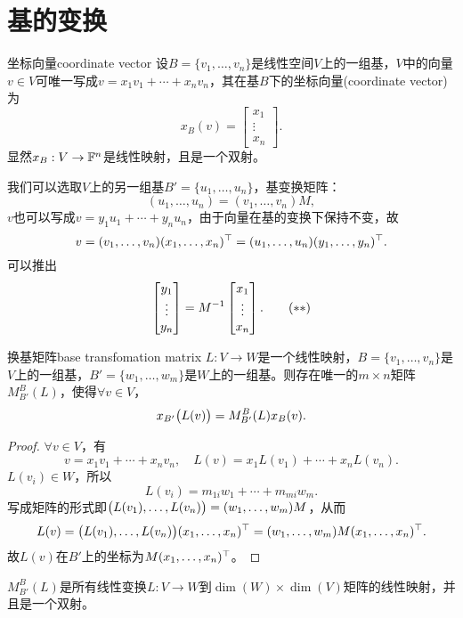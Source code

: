 \section{基的变换}
\begin{definition}{坐标向量}{coordinate vector}
	设$B=\{v_1,\ldots,v_n\}$是线性空间$V$上的一组基，$V$中的向量$v\in V$可唯一写成$v=x_1v_1+\cdots+x_nv_n$，其在基$B$下的坐标向量(coordinate vector)为
	\[
		x_B(v)=\begin{bmatrix}
			x_1\\\vdots\\x_n
		\end{bmatrix}.
	\]
	显然$x_B:V\to\mathbb F^n$是线性映射，且是一个双射。
\end{definition}
我们可以选取$V$上的另一组基$B'=\{u_1,\ldots,u_n\}$，基变换矩阵：
\[
	(u_1,\ldots,u_n)=(v_1,\ldots,v_n)M,\tag{$\ast$}
\]
$v$也可以写成$v=y_1u_1+\cdots+y_nu_n$，由于向量在基的变换下保持不变，故
\[
	v=(v_1,\ldots,v_n)(x_1,\ldots,x_n)^\top=(u_1,\ldots,u_n)(y_1,\ldots,y_n)^\top.
\]
可以推出
\[
	\begin{bmatrix}
		y_1\\\vdots\\y_n
	\end{bmatrix}=M^{-1}\begin{bmatrix}
		x_1\\\vdots\\x_n
	\end{bmatrix}.\tag{$\ast\ast$}
\]
\begin{theorem}{换基矩阵}{base transfomation matrix}
	$L:V\to W$是一个线性映射，$B=\{v_1,\ldots,v_n\}$是$V$上的一组基，$B'=\{w_1,\ldots,w_m\}$是$W$上的一组基。则存在唯一的$m\times n$矩阵$M_{B'}^B(L)$，使得$\forall v\in V$，
	\[
		x_{B'}\bigl(L(v)\bigr)=M_{B'}^B(L)x_B(v).
	\]
\end{theorem}
\begin{proof}
	$\forall v\in V$，有
	\[
		v=x_1v_1+\cdots+x_nv_n,\quad L(v)=x_1L(v_1)+\cdots+x_nL(v_n).
	\]
	$L(v_i)\in W$，所以
	\[
		L(v_i)=m_{1i}w_1+\cdots+m_{mi}w_m.
	\]
	写成矩阵的形式即$\bigl(L(v_1),\ldots,L(v_n)\bigr)=(w_1,\ldots,w_m)M$，从而
	\[
		L(v)=\bigl(L(v_1),\ldots,L(v_n)\bigr)(x_1,\ldots,x_n)^\top=(w_1,\ldots,w_m)M(x_1,\ldots,x_n)^\top.
	\]
	故$L(v)$在$B'$上的坐标为$M(x_1,\ldots,x_n)^\top$。
\end{proof}

\begin{corollary}
	$M_{B'}^B(L)$是所有线性变换$L:V\to W$到$\dim(W)\times\dim(V)$矩阵的线性映射，并且是一个双射。
\end{corollary}

